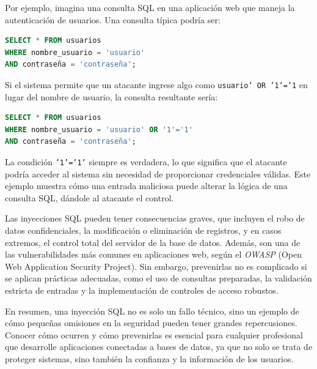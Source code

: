 \documentclass[a4paper,12pt]{article}
\begin{document}
 Por ejemplo, imagina una consulta SQL en una aplicación web que maneja la autenticación de usuarios. Una consulta típica podría ser:
 \vspace{0,2cm}

 \begin{lstlisting}[language=SQL]
SELECT * FROM usuarios 
WHERE nombre_usuario = 'usuario' 
AND contraseña = 'contraseña';
 \end{lstlisting}
 \vspace{0,2cm}

 Si el sistema permite que un atacante ingrese algo como \texttt{usuario' OR '1'='1} en lugar del nombre de usuario, la consulta resultante sería:
 \vspace{0,2cm}

 \begin{lstlisting}[language=SQL]
SELECT * FROM usuarios 
WHERE nombre_usuario = 'usuario' OR '1'='1' 
AND contraseña = 'contraseña';
\end{lstlisting}
\vspace{0,2cm}

 La condición \texttt{'1'='1'} siempre es verdadera, lo que significa que el atacante podría acceder al sistema sin necesidad de proporcionar credenciales válidas. Este ejemplo muestra cómo una entrada maliciosa puede alterar la lógica de una consulta SQL, dándole al atacante el control.
 \vspace{0,5cm}

 Las inyecciones SQL pueden tener consecuencias graves, que incluyen el robo de datos confidenciales, la modificación o eliminación de registros, y en casos extremos, el control total del servidor de la base de datos. Además, son una de las vulnerabilidades más comunes en aplicaciones web, según el \textit{OWASP} (Open Web Application Security Project). Sin embargo, prevenirlas no es complicado si se aplican prácticas adecuadas, como el uso de consultas preparadas, la validación estricta de entradas y la implementación de controles de acceso robustos.
 \vspace{0,5cm}

 En resumen, una inyección SQL no es solo un fallo técnico, sino un ejemplo de cómo pequeñas omisiones en la seguridad pueden tener grandes repercusiones. Conocer cómo ocurren y cómo prevenirlas es esencial para cualquier profesional que desarrolle aplicaciones conectadas a bases de datos, ya que no solo se trata de proteger sistemas, sino también la confianza y la información de los usuarios.
 
\end{document}
